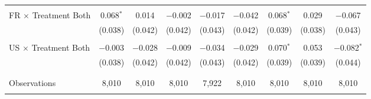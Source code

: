 \begin{tabular}{@{\extracolsep{5pt}}lcccccccc}
  & & & & & & & & \\ 
 FR $\times$ Treatment Both & 0.068$^{*}$ & 0.014 & $-$0.002 & $-$0.017 & $-$0.042 & 0.068$^{*}$ & 0.029 & $-$0.067 \\ 
  & (0.038) & (0.042) & (0.042) & (0.043) & (0.042) & (0.039) & (0.038) & (0.043) \\ 
  & & & & & & & & \\ 
 US $\times$ Treatment Both & $-$0.003 & $-$0.028 & $-$0.009 & $-$0.034 & $-$0.029 & 0.070$^{*}$ & 0.053 & $-$0.082$^{*}$ \\ 
  & (0.038) & (0.042) & (0.042) & (0.043) & (0.042) & (0.039) & (0.039) & (0.044) \\ 
  & & & & & & & & \\ 
\hline \\[-1.8ex] 

Observations & 8,010 & 8,010 & 8,010 & 7,922 & 8,010 & 8,010 & 8,010 & 8,010 \\ 
\hline 
\hline \\[-1.8ex] 
\end{tabular} 
